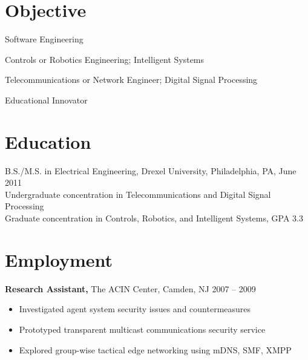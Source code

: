 \documentclass[margin]{res}
\begin{document}
 
 
 
\address{{\bf Present Address} \\ 4042 Powelton Avenue \#2 \\ Philadelphia, PA 19104  \\
        (215) 501-7891 }
\address{{\bf Permanent Address} \\ 1726 Reyburn Creek Road \\ Malvern, AR 72104 \\
        (501) 337-8485 }

\begin{resume} 
 
\section{Objective}
\begin{software}
Software Engineering
\end{software}

\begin{controls}
Controls or Robotics Engineering; Intelligent Systems
\end{controls}

\begin{telecom}
Telecommunications or Network Engineer; Digital Signal Processing
\end{telecom}

\begin{educate}
Educational Innovator
\end{educate}

\section{Education} 
B.S./M.S. in Electrical Engineering, Drexel University, Philadelphia, PA, June 2011 \\
Undergraduate concentration in Telecommunications and Digital Signal Processing \\
Graduate concentration in Controls, Robotics, and Intelligent Systems, GPA 3.3 

\section{Employment}
 {\bf Research Assistant,} The ACIN Center, Camden, NJ \hfill 2007 -- 2009
 \begin{itemize} \itemsep -2pt  %
 \item Investigated agent system security issues and countermeasures 
 \item Prototyped transparent multicast communications security service 
\item Explored group-wise tactical edge networking using mDNS, SMF, XMPP 
 \end{itemize}


\end{resume}
\end{document}
